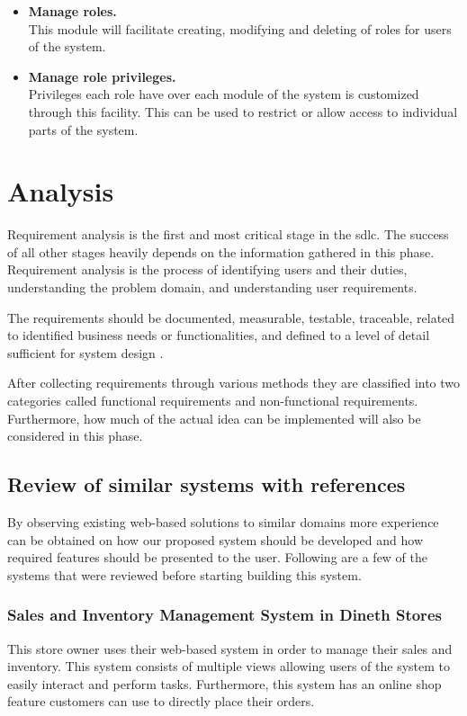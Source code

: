 \documentclass[12pt]{report}
\begin{document}
\begin{itemize}
	\item {\bf{Manage roles.}}\\
	      This module will facilitate creating, modifying and deleting of roles for users of the system.

	\item {\bf{Manage role privileges.}}\\
	      Privileges each role have over each module of the system is customized through this facility. This can be used to restrict or allow access to individual parts of the system.
\end{itemize}

\newpage
\chapter{Analysis}

Requirement analysis is the first and most critical stage in the \acrlong{sdlc}. The success of all other stages heavily depends on the information gathered in this phase. Requirement analysis is the process of identifying users and their duties, understanding the problem domain, and understanding user requirements.

The requirements should be documented, measurable, testable, traceable, related to identified business needs or functionalities, and defined to a level of detail sufficient for system design \cite{sommerville_2008_se}.

After collecting requirements through various methods they are classified into two categories called functional requirements and non-functional requirements. Furthermore, how much of the actual idea can be implemented will also be considered in this phase.

\section{Review of similar systems with references}
By observing existing web-based solutions to similar domains more experience can be obtained on how our proposed system should be developed and how required features should be presented to the user.  Following are a few of the systems that were reviewed before starting building this system.

\subsection{Sales and Inventory Management System in Dineth Stores}
This store owner uses their web-based system in order to manage their sales and inventory. This system consists of multiple views allowing users of the system to easily interact and perform tasks.  Furthermore, this system has an online shop feature customers can use to directly place their orders.
\end{document}
